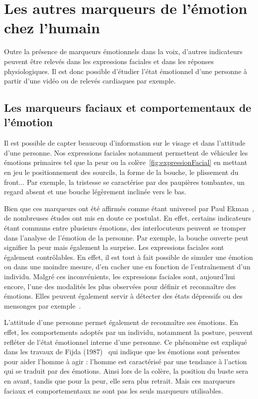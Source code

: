 \section{Les autres marqueurs de l'émotion chez l'humain}
Outre la présence de marqueurs émotionnels dans la voix, d'autres indicateurs peuvent être relevés dans les expressions faciales et dans les réponses physiologiques. Il est donc possible d'étudier l'état émotionnel d'une personne à partir d'une vidéo ou de relevés cardiaques par exemple.

\subsection{Les marqueurs faciaux et comportementaux de l'émotion}


Il est possible de capter beaucoup d'information sur le visage et dans l'attitude d'une personne. Nos expressions faciales notamment permettent de véhiculer les émotions primaires tel que la peur ou la colère~\ref{fig:expressionFacial} en mettant en jeu le positionnement des sourcils, la forme de la bouche, le plissement du front...
Par exemple, la tristesse se caractérise par des paupières tombantes, un regard absent et une bouche légèrement inclinée vers le bas.

Bien que ces marqueurs ont été affirmés comme étant universel par Paul Ekman~\cite{Ekman1978}, de nombreuses études ont mis en doute ce postulat. En effet, certains indicateurs étant communs entre plusieurs émotions, des interlocuteurs peuvent se tromper dans l'analyse de l'émotion de la personne. Par exemple, la bouche ouverte peut signifier la peur mais également la surprise. Les expressions faciales sont également contrôlables. En effet, il est tout à fait possible de simuler une émotion ou dans une moindre mesure, d'en cacher une en fonction de l’entraînement d'un individu.
Malgré ces inconvénients, les expressions faciales sont, aujourd'hui encore, l'une des modalités les plus observées pour définir et reconnaître des émotions. Elles peuvent également servir à détecter des états dépressifs ou des mensonges par exemple~\cite{Suslow2001,Owayjan2012}.

L'attitude d'une personne permet également de reconnaître ses émotions. En effet, les comportements adoptés par un individu, notamment la posture, peuvent refléter de l'état émotionnel interne d'une personne. Ce phénomène est expliqué dans les travaux de Fijda (1987)~\cite{Fijda1987} qui indique que les émotions sont présentes pour aider l'homme à agir : l'homme est caractérisé par une tendance à l'action qui se traduit par des émotions. Ainsi lors de la colère, la position du buste sera en avant, tandis que pour la peur, elle sera plus retrait. Mais ces marqueurs faciaux et comportementaux ne sont pas les seuls marqueurs utilisables.

